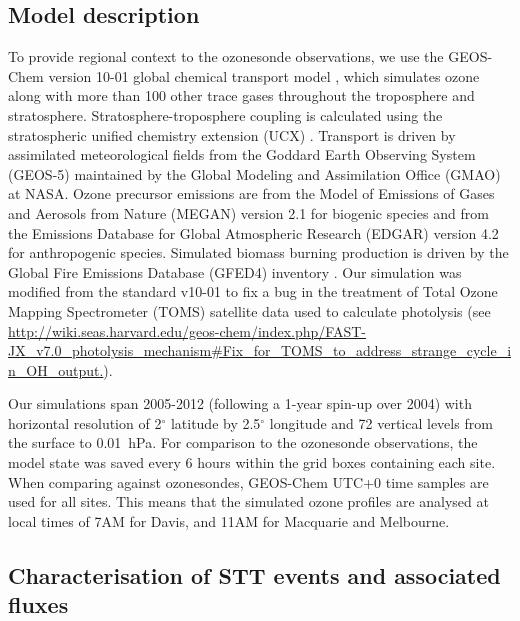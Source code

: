   \subsection{Model description}
    \label{Section:GEOSChemDescription}
    To provide regional context to the ozonesonde observations, we use the GEOS-Chem version 10-01 global chemical transport model \citep{Bey2001}, which simulates ozone along with more than 100 other trace gases throughout the troposphere and stratosphere. 
    Stratosphere-troposphere coupling is calculated using the stratospheric unified chemistry extension (UCX) \citep{Eastham2014}.
    Transport is driven by assimilated meteorological fields from the Goddard Earth Observing System (GEOS-5) maintained by the Global Modeling and Assimilation Office (GMAO) at NASA.
    Ozone precursor emissions are from the Model of Emissions of Gases and Aerosols from Nature (MEGAN) version 2.1 \citep{Guenther2012} for biogenic species and from the Emissions Database for Global Atmospheric Research (EDGAR) version 4.2 for anthropogenic species.
    Simulated biomass burning production is driven by the Global Fire Emissions Database (GFED4) inventory \citep{Giglio2013}. 
    Our simulation was modified from the standard v10-01 to fix a bug in the treatment of Total Ozone Mapping Spectrometer (TOMS) satellite data used to calculate photolysis (see \url{http://wiki.seas.harvard.edu/geos-chem/index.php/FAST-JX_v7.0_photolysis_mechanism#Fix_for_TOMS_to_address_strange_cycle_in_OH_output.}).  

    Our simulations span 2005-2012 (following a 1-year spin-up over 2004) with horizontal resolution of 2$^{\circ}$ latitude by 2.5$^{\circ}$ longitude and 72 vertical levels from the surface to 0.01~hPa.
    For comparison to the ozonesonde observations, the model state was saved every 6 hours within the grid boxes containing each site.
    When comparing against ozonesondes, GEOS-Chem UTC+0 time samples are used for all sites.
    This means that the simulated ozone profiles are analysed at local times of 7AM for Davis, and 11AM for Macquarie and Melbourne.
    
  \subsection{Characterisation of STT events and associated fluxes}
    \label{Section:CharacterisationOfSTTs}
    
